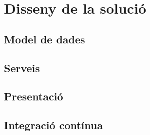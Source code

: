 
\chapter{Disseny de la solució}\label{disseny}

\section{Model de dades}

\section{Serveis}

\section{Presentació}
	
\section{Integració contínua}


